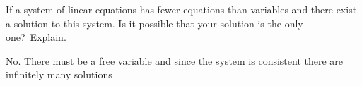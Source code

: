 
\begin{Exercise}[
name={},
title={}, 
difficulty=0,
origin={\cite{KK}}]
If a system of linear equations has fewer equations than variables and
there exist a solution to this system. Is it possible that
your solution is the only one?\ Explain.
\end{Exercise}
\begin{Answer}
No.  There must be a free variable and since the system is consistent there are infinitely many solutions 
\end{Answer}
